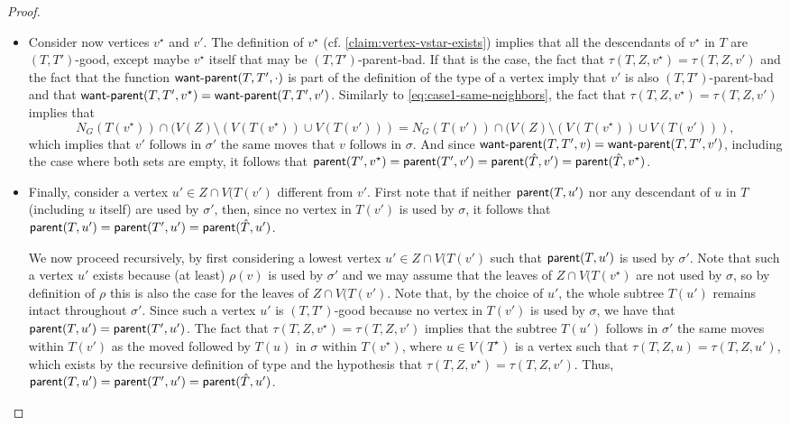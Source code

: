 \documentclass[a4paper,UKenglish,cleveref, autoref, thm-restate]{lipics-v2021}
\newenvironment{cproof}{\proof[Proof of claim]\renewcommand\qedsymbol{$\diamond$}}{\endproof}
\newcommand{\parent}{{\sf parent}\xspace}
\newcommand{\wantparent}{{\sf {\sf want{\text -}parent}}\xspace}
\begin{document}
\begin{proof}
\begin{cproof}
\begin{itemize}
 \item Consider now vertices $v^{\star}$ and $v'$. The definition of $v^{\star}$ (cf. \autoref{claim:vertex-vstar-exists})
implies that all the descendants of $v^{\star}$ in $T$ are $(T,T')$-good, except maybe $v^{\star}$ itself that may be $(T,T')$-parent-bad. If that is the case, the fact that $\tau(T,Z,v^{\star})=\tau(T,Z,v')$ and the fact that the function $\wantparent(T,T',\cdot)$ is part of the definition of the type of a vertex imply that $v'$ is also $(T,T')$-parent-bad and that $\wantparent(T,T',v^{\star}) = \wantparent(T,T',v')$.  Similarly to \autoref{eq:case1-same-neighbors}, the fact that $\tau(T,Z,v^{\star}) = \tau(T,Z,v')$ implies that
\begin{equation}\label{eq:case2-same-neighbors-again}
    N_G(T(v^{\star})) \cap  (V(Z) \setminus (V(T(v^{\star})) \cup V(T(v')))= N_G(T(v')) \cap  (V(Z) \setminus (V(T(v^{\star})) \cup V(T(v'))),
  \end{equation}
which implies that $v'$ follows in $\sigma'$ the same moves that $v$ follows in $\sigma$. And since $\wantparent(T,T',v) = \wantparent(T,T',v')$, including the case where both sets are empty, it follows that $\parent(T',v^{\star}) = \parent(T',v') = \parent(\hat{T},v')=\parent(\hat{T},v^{\star})$.

\item Finally, consider a vertex $u' \in Z \cap V(T(v')$ different from $v'$. First note that if neither $\parent(T,u')$ nor any descendant of $u$ in $T$ (including $u$ itself) are used by $\sigma'$, then, since no vertex in $T(v')$ is used by $\sigma$, it follows that $\parent(T,u')= \parent(T',u') = \parent(\hat{T},u')$.

    We now proceed recursively, by first considering a lowest vertex $u' \in Z \cap V(T(v')$ such that $\parent(T,u')$ is used by $\sigma'$. Note that such a vertex $u'$ exists because (at least) $\rho(v)$ is used by $\sigma'$ and we may assume that the leaves of $Z \cap V(T(v^{\star})$ are not used by $\sigma$, so by definition of $\rho$ this is also the case for the leaves of $Z \cap V(T(v')$. Note that, by the choice of $u'$,  the whole subtree $T(u')$ remains intact throughout $\sigma'$. Since such a vertex $u'$ is $(T,T')$-good because no vertex in $T(v')$ is used by $\sigma$, we have that $\parent(T,u')= \parent(T',u')$. The fact that $\tau(T,Z,v^{\star})=\tau(T,Z,v')$ implies that the subtree $T(u')$ follows in $\sigma'$ the same moves within $T(v')$ as the moved followed by $T(u)$ in $\sigma$ within $T(v^{\star})$, where $u \in V(T^{\star})$ is a vertex such that $\tau(T,Z,u)=\tau(T,Z,u')$, which exists by the recursive definition of type and the hypothesis that $\tau(T,Z,v^{\star})=\tau(T,Z,v')$. Thus, $\parent(T,u')= \parent(T',u') = \parent(\hat{T},u')$.


\end{itemize}
\end{cproof}
\end{proof}
\end{document}
